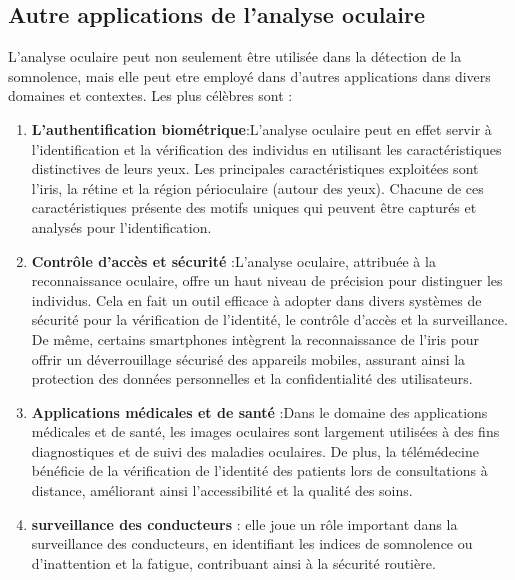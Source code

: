 \subsection{Autre applications de l'analyse oculaire}
L'analyse oculaire peut non seulement être utilisée dans la détection de la somnolence, mais elle peut etre employé dans d'autres applications dans divers domaines et contextes. Les plus célèbres sont :
\begin{enumerate}
    \item \textbf{L'authentification biométrique}:L’analyse oculaire peut en effet servir à l’identification et la vérification des individus en utilisant les caractéristiques distinctives de leurs yeux. Les principales caractéristiques exploitées sont l’iris, la rétine et la région périoculaire (autour des yeux). Chacune de ces caractéristiques présente des motifs uniques qui peuvent être capturés et analysés pour l’identification.
    \item \textbf{Contrôle d'accès et sécurité }:L’analyse oculaire, attribuée à la reconnaissance oculaire, offre un haut niveau de précision pour distinguer les individus. Cela en fait un outil efficace à adopter dans divers systèmes de sécurité pour la vérification de l’identité, le contrôle d’accès et la surveillance. De même, certains smartphones intègrent la reconnaissance de l’iris pour offrir un déverrouillage sécurisé des appareils mobiles, assurant ainsi la protection des données personnelles et la confidentialité des utilisateurs.
    \item \textbf{Applications médicales et de santé }:Dans le domaine des applications médicales et de santé, les images oculaires sont largement utilisées à des fins diagnostiques et de suivi des maladies oculaires. De plus, la télémédecine bénéficie de la vérification de l'identité des patients lors de consultations à distance, améliorant ainsi l'accessibilité et la qualité des soins.
    \item \textbf{surveillance des conducteurs} :  elle joue un rôle important dans la surveillance des conducteurs, en identifiant les indices de somnolence ou d’inattention et la fatigue,  contribuant ainsi à la sécurité routière.
\end{enumerate}
